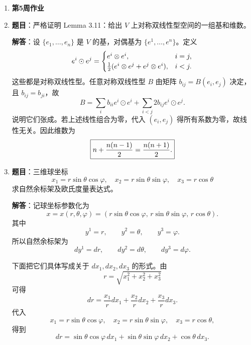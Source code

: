 \documentclass[UTF8,12pt,a4paper]{ctexart}
\newcommand{\homeworkweek}[1]{%
  \item[]\vspace{0.35em}\noindent\textbf{\large #1}\vspace{0.15em}
}
\begin{document}
\begin{enumerate}
最后由
\[
z=x_3
\]
直接取微分，得到
\[
\boxed{
	dz=dx_3.
}
\]

综上，柱坐标的自然余标架关于直角坐标余标架 $(dx_1,dx_2,dx_3)$ 的表达为
\[
\boxed{
	dr=\cos\theta\,dx_1+\sin\theta\,dx_2,
}
\]
\[
\boxed{
	d\theta=-{\sin\theta\over r}\,dx_1+{\cos\theta\over r}\,dx_2,
}
\]
\[
\boxed{
	dz=dx_3.
}
\]
其中要求 $r>0$，因为在 $r=0$ 处角坐标 $\theta$ 不再是良好的局部坐标。
```

\homeworkweek{第5周作业}
\item \textbf{题目}：严格证明 Lemma 3.11：给出 $V$ 上对称双线性型空间的一组基和维数。

\textbf{解答}：设 $\{e_1,\dots,e_n\}$ 是 $V$ 的基，对偶基为 $\{e^1,\dots,e^n\}$。定义
\[
e^i\odot e^j=\begin{cases}
e^i\otimes e^i,&i=j,\\
{1\over2}(e^i\otimes e^j+e^j\otimes e^i),&i<j.
\end{cases}
\]
这些都是对称双线性型。任意对称双线性型 $B$ 由矩阵 $b_{ij}=B(e_i,e_j)$ 决定，且 $b_{ij}=b_{ji}$，故
\[
B=\sum_i b_{ii}e^i\odot e^i+\sum_{i<j}2b_{ij}e^i\odot e^j.
\]
说明它们张成。若上述线性组合为零，代入 $(e_i,e_j)$ 得所有系数为零，故线性无关。因此维数为
\[
\boxed{n+{n(n-1)\over2}={n(n+1)\over2}.}
\]

\item \textbf{题目}：三维球坐标
\[
x_1=r\sin\theta\cos\varphi,\quad
x_2=r\sin\theta\sin\varphi,\quad
x_3=r\cos\theta
\]
求自然余标架及欧氏度量表达式。

\textbf{解答}：记球坐标参数化为
\[
x=x(r,\theta,\varphi)
=
(r\sin\theta\cos\varphi,\,
r\sin\theta\sin\varphi,\,
r\cos\theta).
\]
其中
\[
y^1=r,\qquad y^2=\theta,\qquad y^3=\varphi.
\]
所以自然余标架为
\[
dy^1=dr,\qquad dy^2=d\theta,\qquad dy^3=d\varphi.
\]

下面把它们具体写成关于 \(dx_1,dx_2,dx_3\) 的形式。由
\[
r=\sqrt{x_1^2+x_2^2+x_3^2}
\]
可得
\[
dr
=
\frac{x_1}{r}dx_1+\frac{x_2}{r}dx_2+\frac{x_3}{r}dx_3.
\]
代入
\[
x_1=r\sin\theta\cos\varphi,\quad
x_2=r\sin\theta\sin\varphi,\quad
x_3=r\cos\theta,
\]
得到
\[
\boxed{
	dr
	=
	\sin\theta\cos\varphi\,dx_1
	+\sin\theta\sin\varphi\,dx_2
	+\cos\theta\,dx_3.
}
\]


\end{enumerate}
\end{document}
